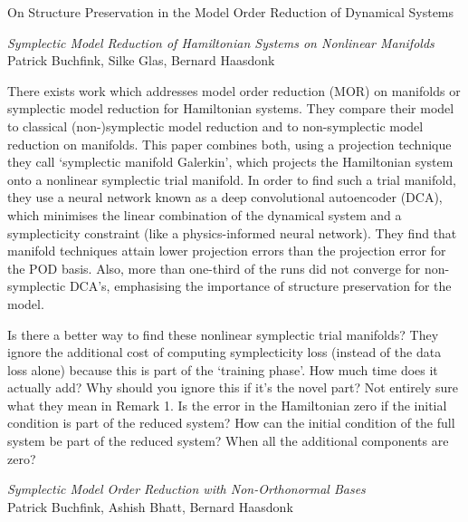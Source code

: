 \documentclass{article}
\begin{document}
\begin{center}
    \huge{On Structure Preservation in the Model Order Reduction of Dynamical Systems}
\end{center}


\vspace{2cm}

\begin{center}
    \textit{Symplectic Model Reduction of Hamiltonian Systems on Nonlinear Manifolds} \\
    Patrick Buchfink, Silke Glas, Bernard Haasdonk \cite{buchfink2021}
\end{center}

There exists work which addresses model order reduction (MOR) on manifolds or symplectic model reduction for Hamiltonian systems. They compare their model to classical (non-)symplectic model reduction and to non-symplectic model reduction on manifolds. This paper combines both, using a projection technique they call `symplectic manifold Galerkin', which projects the Hamiltonian system onto a nonlinear symplectic trial manifold. In order to find such a trial manifold, they use a neural network known as a deep convolutional autoencoder (DCA), which minimises the linear combination of the dynamical system and a symplecticity constraint (like a physics-informed neural network). They find that manifold techniques attain lower projection errors than the projection error for the POD basis. Also, more than one-third of the runs did not converge for non-symplectic DCA's, emphasising the importance of structure preservation for the model. \newline

Is there a better way to find these nonlinear symplectic trial manifolds? They ignore the additional cost of computing symplecticity loss (instead of the data loss alone) because this is part of the `training phase'. How much time does it actually add? Why should you ignore this if it's the novel part? Not entirely sure what they mean in Remark 1. Is the error in the Hamiltonian zero if the initial condition is part of the reduced system? How can the initial condition of the full system be part of the reduced system? When all the additional components are zero?


\vspace{2cm}

\begin{center}
    \textit{Symplectic Model Order Reduction with Non-Orthonormal Bases} \\ 
    Patrick Buchfink, Ashish Bhatt, Bernard Haasdonk  \cite{buchfink2019}
\end{center}
\end{document}
